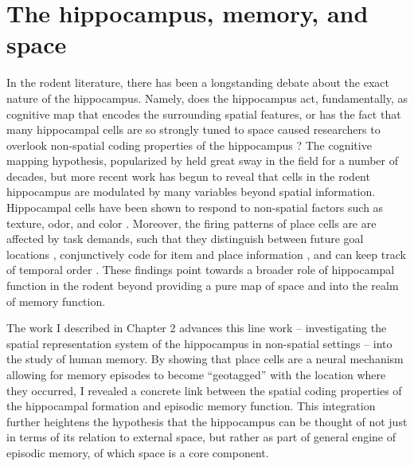 

\section{The hippocampus, memory, and space}
In the rodent literature, there has been a longstanding debate about the exact nature of the hippocampus. Namely, does the hippocampus act, fundamentally, as cognitive map that encodes the surrounding spatial features, or has the fact that many hippocampal cells are so strongly tuned to space caused researchers to overlook non-spatial coding properties of the hippocampus \citep{EichEtal99}? The cognitive mapping hypothesis, popularized by \citet{OKeeNade78} held great sway in the field for a number of decades, but more recent work has begun to reveal that cells in the rodent hippocampus are modulated by many variables beyond spatial information. Hippocampal cells have been shown to respond to non-spatial factors such as texture, odor, and color \citep{YounEtal94,WoodEtal99,LeutEtal05,IgarEtal14}. Moreover, the firing patterns of place cells are are affected by task demands, such that they distinguish between future goal locations \citep{WoodEtal00,FerbShap03}, conjunctively code for item and place information \citep{KomoEtal09}, and can keep track of temporal order \citep{MannEtal07}. These findings point towards a broader role of hippocampal function in the rodent beyond providing a pure map of space and into the realm of memory function.

The work I described in Chapter 2 advances this line work -- investigating the spatial representation system of the hippocampus in non-spatial settings -- into the study of human memory. By showing that place cells are a neural mechanism allowing for memory episodes to become ``geotagged'' with the location where they occurred, I revealed a concrete link between the spatial coding properties of the hippocampal formation and episodic memory function. This integration further heightens the hypothesis that the hippocampus can be thought of not just in terms of its relation to external space, but rather as part of general engine of episodic memory, of which space is a core component.

